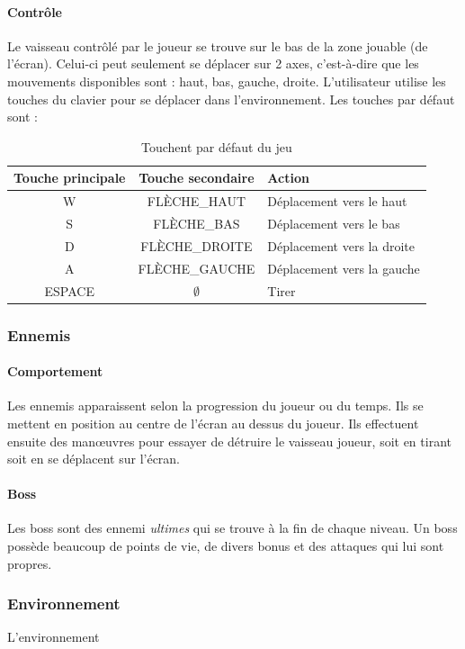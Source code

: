 \documentclass[11pt, a4paper, oneside]{article}
\begin{document}
\paragraph{Contrôle}
Le vaisseau contrôlé par le joueur se trouve sur le bas de la zone jouable (de l'écran). Celui-ci peut seulement se déplacer sur 2 axes, c'est-à-dire que les mouvements disponibles sont : haut, bas, gauche, droite. L'utilisateur utilise les touches du clavier pour se déplacer dans l'environnement. Les touches par défaut sont :
\begin{table}[h]
	\begin{center}
		\begin{tabular}{|c|c|l|}
			\hline
			\textbf{Touche principale} & \textbf{Touche secondaire} & \textbf{Action}\\
			\hline \hline
			W & FLÈCHE\_HAUT & Déplacement vers le haut\\ \hline
			S & FLÈCHE\_BAS & Déplacement vers le bas\\ \hline
			D & FLÈCHE\_DROITE & Déplacement vers la droite\\ \hline
			A & FLÈCHE\_GAUCHE & Déplacement vers la gauche\\ \hline
			ESPACE & $\emptyset$ & Tirer\\
			\hline
		\end{tabular}
		\caption{Touchent par défaut du jeu}
		\label{table:touchesjeu}
	\end{center}
\end{table}
\subsubsection{Ennemis}
\paragraph{Comportement}
Les ennemis apparaissent selon la progression du joueur ou du temps. Ils se mettent en position au centre de l'écran au dessus du joueur. Ils effectuent ensuite des manœuvres pour essayer de détruire le vaisseau joueur, soit en tirant soit en se déplacent sur l'écran.
\paragraph{Boss}
Les boss sont des ennemi \emph{ultimes} qui se trouve à la fin de chaque niveau. Un boss possède beaucoup de points de vie, de divers bonus et des attaques qui lui sont propres.
\subsubsection{Environnement}
L'environnement 
\end{document}
